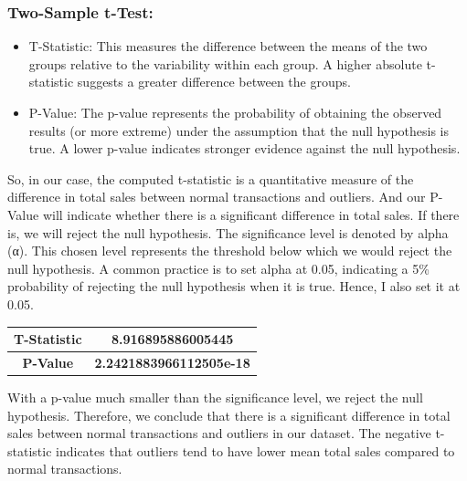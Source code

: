 \subsubsection{Two-Sample t-Test:}
\begin{itemize}
    \item T-Statistic: This measures the difference between the means of the two groups relative to the variability within each group. A higher absolute t-statistic suggests a greater difference between the groups.
    \item P-Value: The p-value represents the probability of obtaining the observed results (or more extreme) under the assumption that the null hypothesis is true. A lower p-value indicates stronger evidence against the null hypothesis.
\end{itemize}
So, in our case, the computed t-statistic is a quantitative measure of the difference in total sales between normal transactions and outliers. And our P-Value will indicate whether there is a significant difference in total sales. If there is, we will reject the null hypothesis.
\newline 
The significance level is denoted by alpha (α). This chosen level represents the threshold below which we would reject the null hypothesis. A common practice is to set alpha at 0.05, indicating a 5\% probability of rejecting the null hypothesis when it is true. Hence, I also set it at 0.05.

\begin{center}
\begin{tabular}{|c|c|}
\hline
\rowcolor{green!20} \textbf{T-Statistic} & \textbf{8.916895886005445} \\
\hline
\cellcolor{green!10} \textbf{P-Value} & \textbf{2.2421883966112505e-18} \\
\hline
\end{tabular}
\end{center}

With a p-value much smaller than the significance level, we reject the null hypothesis. Therefore, we conclude that there is a significant difference in total sales between normal transactions and outliers in our dataset.
\newline
The negative t-statistic indicates that outliers tend to have lower mean total sales compared to normal transactions. 



